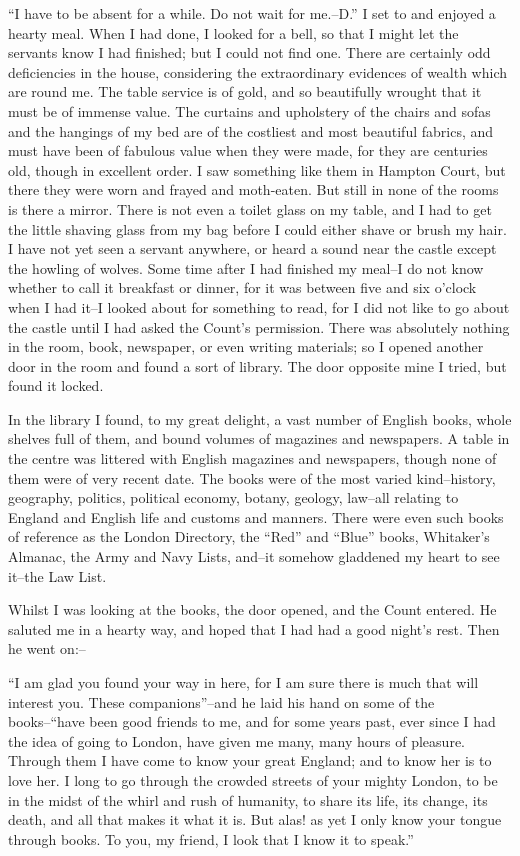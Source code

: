 \documentclass[12pt,openright]{book}
\begin{document}
“I have to be absent for a while. Do not wait for me.–D.” I set to and enjoyed a hearty meal. When I had done, I looked for a bell, so that I might let the servants know I had finished; but I could not find one. There are certainly odd deficiencies in the house, considering the extraordinary evidences of wealth which are round me. The table service is of gold, and so beautifully wrought that it must be of immense value. The curtains and upholstery of the chairs and sofas and the hangings of my bed are of the costliest and most beautiful fabrics, and must have been of fabulous value when they were made, for they are centuries old, though in excellent order. I saw something like them in Hampton Court, but there they were worn and frayed and moth-eaten. But still in none of the rooms is there a mirror. There is not even a toilet glass on my table, and I had to get the little shaving glass from my bag before I could either shave or brush my hair. I have not yet seen a servant anywhere, or heard a sound near the castle except the howling of wolves. Some time after I had finished my meal–I do not know whether to call it breakfast or dinner, for it was between five and six o’clock when I had it–I looked about for something to read, for I did not like to go about the castle until I had asked the Count’s permission. There was absolutely nothing in the room, book, newspaper, or even writing materials; so I opened another door in the room and found a sort of library. The door opposite mine I tried, but found it locked.

In the library I found, to my great delight, a vast number of English books, whole shelves full of them, and bound volumes of magazines and newspapers. A table in the centre was littered with English magazines and newspapers, though none of them were of very recent date. The books were of the most varied kind–history, geography, politics, political economy, botany, geology, law–all relating to England and English life and customs and manners. There were even such books of reference as the London Directory, the “Red” and “Blue” books, Whitaker’s Almanac, the Army and Navy Lists, and–it somehow gladdened my heart to see it–the Law List.

Whilst I was looking at the books, the door opened, and the Count entered. He saluted me in a hearty way, and hoped that I had had a good night’s rest. Then he went on:–

“I am glad you found your way in here, for I am sure there is much that will interest you. These companions”–and he laid his hand on some of the books–“have been good friends to me, and for some years past, ever since I had the idea of going to London, have given me many, many hours of pleasure. Through them I have come to know your great England; and to know her is to love her. I long to go through the crowded streets of your mighty London, to be in the midst of the whirl and rush of humanity, to share its life, its change, its death, and all that makes it what it is. But alas! as yet I only know your tongue through books. To you, my friend, I look that I know it to speak.”
\end{document}
